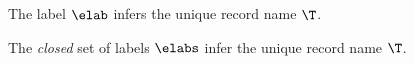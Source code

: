 \documentclass[acmsmall,screen,nonacm%
\Anonymous{,anonymous}{}%
\Final{}{,review}%
]{acmart}
\begin{document}
\judgbox
  {\labuni \elab \T}
  {The label $\elab$ infers the unique record name $\T$.}

\begin{judgboxmathpar}
  {\labsuni \elabs \T}
  {The \emph{closed} set of labels $\elabs$ infer the unique record name $\T$.}
    {\labuni \elab \T}

    {\labsuni \elabs \T}
\end{judgboxmathpar}
\end{document}
